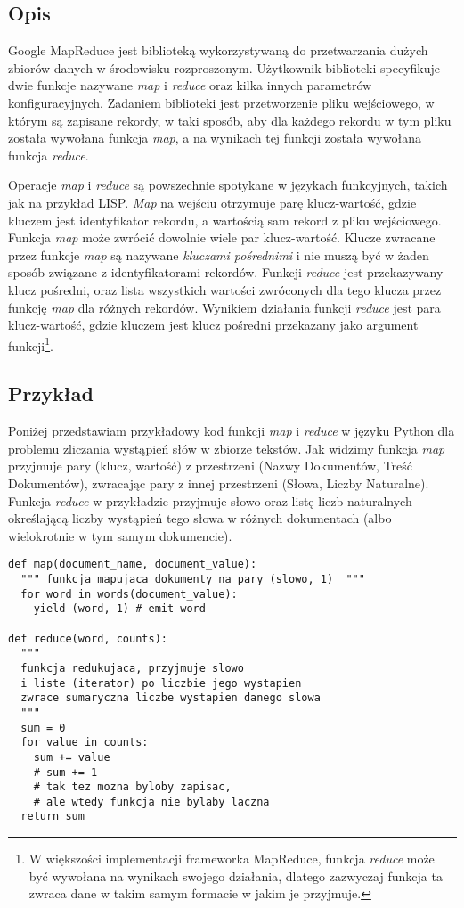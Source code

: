 \subsection*{Opis}

Google MapReduce \cite{google-mapreduce} jest biblioteką wykorzystywaną do przetwarzania dużych zbiorów danych w środowisku rozproszonym.
Użytkownik biblioteki specyfikuje dwie funkcje nazywane \emph{map} i \emph{reduce} oraz kilka innych parametrów konfiguracyjnych.
Zadaniem biblioteki jest przetworzenie pliku wejściowego, w którym są zapisane rekordy, w taki sposób, aby dla każdego rekordu w tym pliku została wywołana funkcja \emph{map}, a na wynikach tej funkcji została wywołana funkcja \emph{reduce}.

Operacje \emph{map} i \emph{reduce} są powszechnie spotykane w językach funkcyjnych, takich jak na przykład LISP.
\emph{Map} na wejściu otrzymuje parę klucz-wartość, gdzie kluczem jest identyfikator rekordu, a wartością sam rekord z pliku wejściowego.
Funkcja \emph{map} może zwrócić dowolnie wiele par klucz-wartość.
Klucze zwracane przez funkcje \emph{map} są nazywane \emph{kluczami pośrednimi} i nie muszą być w żaden sposób związane z identyfikatorami rekordów.
Funkcji \emph{reduce} jest przekazywany klucz pośredni, oraz lista wszystkich wartości zwróconych dla tego klucza przez funkcję \emph{map} dla różnych rekordów.
Wynikiem działania funkcji \emph{reduce} jest para klucz-wartość, gdzie kluczem jest klucz pośredni przekazany jako argument funkcji\footnote{W większości implementacji frameworka MapReduce, funkcja \emph{reduce} może być wywołana na wynikach swojego działania, dlatego zazwyczaj funkcja ta zwraca dane w takim samym formacie w jakim je przyjmuje.}.

\subsection*{Przykład}

Poniżej przedstawiam przykładowy kod funkcji \emph{map} i \emph{reduce} w języku Python dla problemu zliczania wystąpień słów w zbiorze tekstów. 
Jak widzimy funkcja \emph{map} przyjmuje pary (klucz, wartość) z przestrzeni (Nazwy Dokumentów, Treść Dokumentów), zwracając pary z innej przestrzeni (Słowa, Liczby Naturalne).
Funkcja \emph{reduce} w przykładzie przyjmuje słowo oraz listę liczb naturalnych określającą liczby wystąpień tego słowa w różnych dokumentach (albo wielokrotnie w tym samym dokumencie).

\begin{verbatim}
def map(document_name, document_value):
  """ funkcja mapujaca dokumenty na pary (slowo, 1)  """
  for word in words(document_value):
    yield (word, 1) # emit word

def reduce(word, counts):
  """ 
  funkcja redukujaca, przyjmuje slowo 
  i liste (iterator) po liczbie jego wystapien
  zwrace sumaryczna liczbe wystapien danego slowa
  """
  sum = 0
  for value in counts:
    sum += value
    # sum += 1
    # tak tez mozna byloby zapisac, 
    # ale wtedy funkcja nie bylaby laczna     
  return sum 
\end{verbatim}


